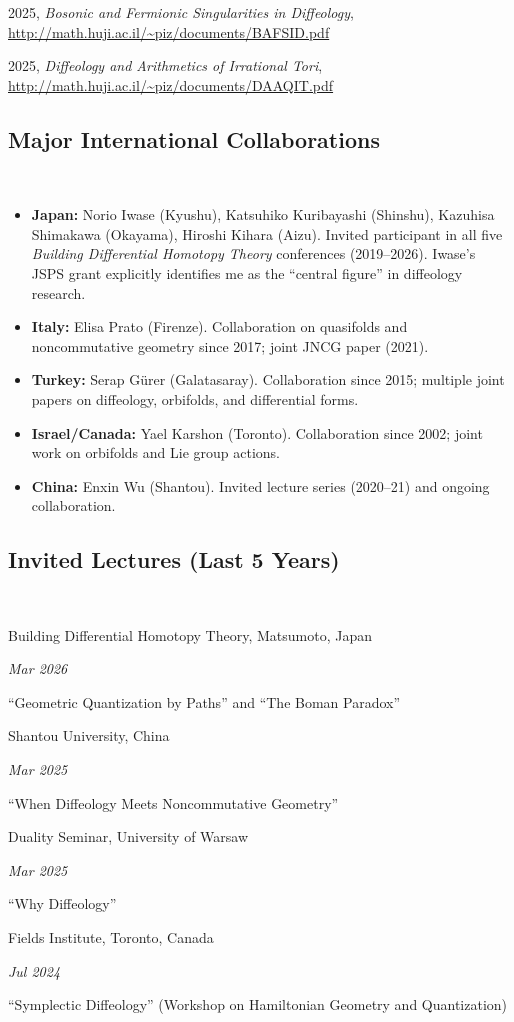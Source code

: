 \documentclass[11pt,reqno]{amsart}
\newlength{\datewidth}
\newcommand{\dateditem}[2]{\noindent\hangindent=0.5cm #1 \hfill \parbox[t]{\datewidth}{\raggedleft\itshape #2}\vspace{.2ex}\par}
\newcommand{\pubitem}[3]{\noindent\hangindent=0.5cm #1, \emph{#2}, #3\vspace{.3ex}\par}
\begin{document}
  \pubitem{2025}{Bosonic and Fermionic Singularities in Diffeology}{\url{http://math.huji.ac.il/~piz/documents/BAFSID.pdf}}
  
  \pubitem{2025}{Diffeology and Arithmetics of Irrational Tori}{\url{http://math.huji.ac.il/~piz/documents/DAAQIT.pdf}}
  
  
  \subsection*{Major International Collaborations} \null\
  
  \begin{itemize}
    \item \textbf{Japan:} Norio Iwase (Kyushu), Katsuhiko Kuribayashi (Shinshu), Kazuhisa Shimakawa (Okayama), Hiroshi Kihara (Aizu). Invited participant in all five \emph{Building Differential Homotopy Theory} conferences (2019–2026). Iwase's JSPS grant explicitly identifies me as the ``central figure'' in diffeology research.
    \item \textbf{Italy:} Elisa Prato (Firenze). Collaboration on quasifolds and noncommutative geometry since 2017; joint JNCG paper (2021).
    \item \textbf{Turkey:} Serap Gürer (Galatasaray). Collaboration since 2015; multiple joint papers on diffeology, orbifolds, and differential forms.
    \item \textbf{Israel/Canada:} Yael Karshon (Toronto). Collaboration since 2002; joint work on orbifolds and Lie group actions.
    \item \textbf{China:} Enxin Wu (Shantou). Invited lecture series (2020–21) and ongoing collaboration.
  \end{itemize}
  
  \subsection*{Invited Lectures (Last 5 Years)} \null\
  
  \dateditem{Building Differential Homotopy Theory, Matsumoto, Japan}{Mar 2026}
  ``Geometric Quantization by Paths'' and ``The Boman Paradox''
  
  \dateditem{Shantou University, China}{Mar 2025}
  ``When Diffeology Meets Noncommutative Geometry''
  
  \dateditem{Duality Seminar, University of Warsaw}{Mar 2025}
  ``Why Diffeology''
  
  \dateditem{Fields Institute, Toronto, Canada}{Jul 2024}
  ``Symplectic Diffeology'' (Workshop on Hamiltonian Geometry and Quantization)
  
\end{document}
